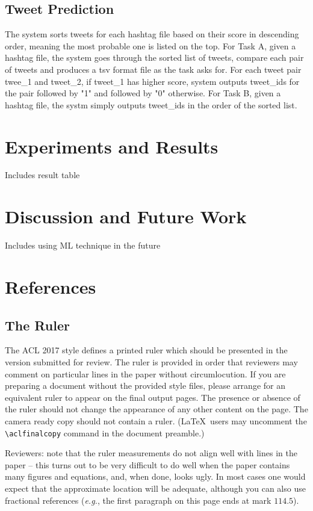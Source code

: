 \documentclass[11pt,a4paper]{article}
\begin{document}
\subsection{Tweet Prediction}
The system sorts tweets for each hashtag file based on their score in descending order, meaning the most probable one is listed on the top. For Task A, given a hashtag file, the system goes through the sorted list of tweets, compare each pair of tweets and produces a tsv format file as the task asks for. For each tweet pair twee\_1 and tweet\_2, if tweet\_1 has higher score, system outputs tweet\_ids for the pair followed by "1" and followed by "0" otherwise. For Task B, given a hashtag file, the systm simply outputs tweet\_ids in the order of the sorted list. 
\section{Experiments and Results}
Includes result table
\section{Discussion and Future Work}
Includes using ML technique in the future
\section{References} 

\subsection{The Ruler}
The ACL 2017 style defines a printed ruler which should be presented in the
version submitted for review.  The ruler is provided in order that
reviewers may comment on particular lines in the paper without
circumlocution.  If you are preparing a document without the provided
style files, please arrange for an equivalent ruler to
appear on the final output pages.  The presence or absence of the ruler
should not change the appearance of any other content on the page.  The
camera ready copy should not contain a ruler. (\LaTeX\ users may uncomment
the {\small\verb|\aclfinalcopy|} command in the document preamble.)  

Reviewers: note that the ruler measurements do not align well with
lines in the paper -- this turns out to be very difficult to do well
when the paper contains many figures and equations, and, when done,
looks ugly. In most cases one would expect that the approximate
location will be adequate, although you can also use fractional
references ({\em e.g.}, the first paragraph on this page ends at mark $114.5$).
\end{document}
